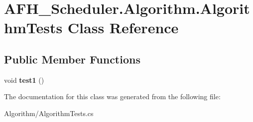 \section{A\+F\+H\+\_\+\+Scheduler.\+Algorithm.\+Algorithm\+Tests Class Reference}
\label{class_a_f_h___scheduler_1_1_algorithm_1_1_algorithm_tests}
\subsection*{Public Member Functions}
\begin{DoxyCompactItemize}
\item 
\mbox{\label{class_a_f_h___scheduler_1_1_algorithm_1_1_algorithm_tests_ab086da1c8df5b255ca6581cb734cb035}} 
void {\bfseries test1} ()
\end{DoxyCompactItemize}


The documentation for this class was generated from the following file\+:\begin{DoxyCompactItemize}
\item 
Algorithm/Algorithm\+Tests.\+cs\end{DoxyCompactItemize}
